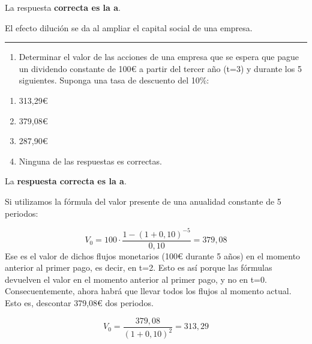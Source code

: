 \documentclass[
  letterpaper,
  DIV=11,
  numbers=noendperiod]{scrreprt}
\providecommand{\tightlist}{%
  \setlength{\itemsep}{0pt}\setlength{\parskip}{0pt}}\usepackage{longtable,booktabs,array}
\begin{document}
\begin{tcolorbox}[enhanced jigsaw, left=2mm, opacityback=0, colback=white, breakable, arc=.35mm, bottomrule=.15mm, rightrule=.15mm, toprule=.15mm, leftrule=.75mm, colframe=quarto-callout-tip-color-frame]
\begin{minipage}[t]{5.5mm}
\textcolor{quarto-callout-tip-color}{\faLightbulb}
\end{minipage}%
\begin{minipage}[t]{\textwidth - 5.5mm}

La respuesta \textbf{correcta es la a}.

El efecto dilución se da al ampliar el capital social de una empresa.

\end{minipage}%
\end{tcolorbox}

\begin{center}\rule{0.5\linewidth}{0.5pt}\end{center}

\begin{enumerate}
\def\labelenumi{\arabic{enumi}.}
\setcounter{enumi}{64}
\tightlist
\item
  Determinar el valor de las acciones de una empresa que se espera que
  pague un dividendo constante de 100€ a partir del tercer año (t=3) y
  durante los 5 siguientes. Suponga una tasa de descuento del 10\%:
\end{enumerate}

\begin{enumerate}
\def\labelenumi{\alph{enumi}.}
\item
  313,29€
\item
  379,08€
\item
  287,90€
\item
  Ninguna de las respuestas es correctas.
\end{enumerate}

\begin{tcolorbox}[enhanced jigsaw, left=2mm, opacityback=0, colback=white, breakable, arc=.35mm, bottomrule=.15mm, rightrule=.15mm, toprule=.15mm, leftrule=.75mm, colframe=quarto-callout-tip-color-frame]
\begin{minipage}[t]{5.5mm}
\textcolor{quarto-callout-tip-color}{\faLightbulb}
\end{minipage}%
\begin{minipage}[t]{\textwidth - 5.5mm}

La \textbf{respuesta correcta es la a}.

Si utilizamos la fórmula del valor presente de una anualidad constante
de 5 periodos:

\[V_0=100 \cdot\frac{1-(1+0,10)^{-5}}{0,10}=379,08\] Ese es el valor de
dichos flujos monetarios (100€ durante 5 años) en el momento anterior al
primer pago, es decir, en t=2. Esto es así porque las fórmulas devuelven
el valor en el momento anterior al primer pago, y no en t=0.
Consecuentemente, ahora habrá que llevar todos los flujos al momento
actual. Esto es, descontar 379,08€ dos periodos.

\[V_0=\frac{379,08}{(1+0,10)^2}=313,29\]

\end{minipage}%
\end{tcolorbox}
\end{document}
